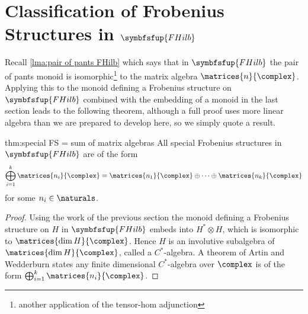 \documentclass[fleqn]{NotesClass}
\makeatletter
\newcommand{\c@egory}[1]{\symbfsfup{#1}}
\newcommand{\FHilb}{\c@egory{FHilb}}
\makeatother
\begin{document}
    \section{Classification of Frobenius Structures in \texorpdfstring{\(\FHilb\)}{FHilb}}
    Recall \cref{lma:pair of pants FHilb} which says that in \(\FHilb\) the pair of pants monoid is isomorphic\footnote{another application of the tensor-hom adjunction} to the matrix algebra \(\matrices{n}{\complex}\).
    Applying this to the monoid defining a Frobenius structure on \(\FHilb\) combined with the embedding of a monoid in the last section leads to the following theorem, although a full proof uses more linear algebra than we are prepared to develop here, so we simply quote a result.
    \begin{thm}{}{thm:special FS = sum of matrix algebras}
        All special Frobenius structures in \(\FHilb\) are of the form
        \begin{equation}
            \bigoplus_{i=1}^{k} \matrices{n_i}{\complex} = \matrices{n_1}{\complex} \oplus \dotsb \oplus \matrices{n_k}{\complex}
        \end{equation}
        for some \(n_i \in \naturals\).
        \begin{proof}
            Using the work of the previous section the monoid defining a Frobenius structure on \(H\) in \(\FHilb\) embeds into \(H^* \otimes H\), which is isomorphic to \(\matrices{\dim H}{\complex}\).
            Hence \(H\) is an involutive subalgebra of \(\matrices{\dim H}{\complex}\), called a \(C^*\)-algebra.
            A theorem of Artin and Wedderburn states any finite dimensional \(C^*\)-algebra over \(\complex\) is of the form \(\bigoplus_{i=1}^k \matrices{n_i}{\complex}\).
        \end{proof}
    \end{thm}
    
\end{document}
